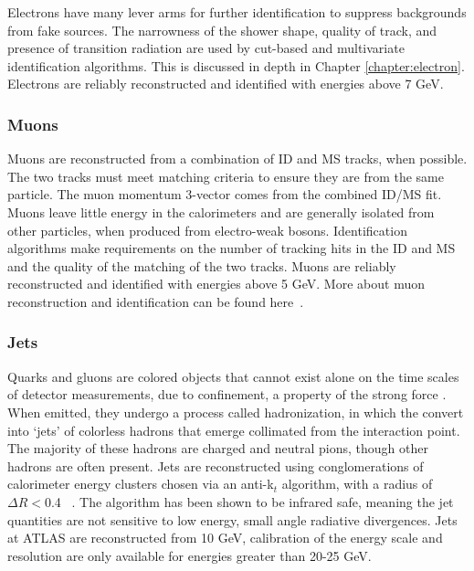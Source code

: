 Electrons have many lever arms for further identification to suppress backgrounds from fake sources. The narrowness of the shower shape, quality of track, and presence of transition radiation are used by cut-based and multivariate identification algorithms. This is discussed in depth in Chapter \ref{chapter:electron}. Electrons are reliably reconstructed and identified with energies above 7 GeV. 

\subsubsection{Muons}

Muons are reconstructed from a combination of ID and MS tracks, when possible. The two tracks must meet matching criteria to ensure they are from the same particle. The muon momentum 3-vector comes from the combined ID/MS fit. Muons leave little energy in the calorimeters and are generally isolated from other particles, when produced from electro-weak bosons. Identification algorithms make requirements on the number of tracking hits in the ID and MS and the quality of the matching of the two tracks. Muons are reliably reconstructed and identified with energies above 5 GeV. More about muon reconstruction and identification can be found here~\cite{MCP2012}.


\subsubsection{Jets}

Quarks and gluons are colored objects that cannot exist alone on the time scales of detector measurements, due to confinement, a property of the strong force . When emitted, they undergo a process called hadronization, in which the convert into `jets' of colorless hadrons that emerge collimated from the interaction point. The majority of these hadrons are charged and neutral pions, though other hadrons are often present. Jets are reconstructed using conglomerations of calorimeter energy clusters chosen via an anti-k$_t$ algorithm, with a radius of $\Delta R <$0.4 ~\cite{Cacciari:2008gp}. The algorithm has been shown to be infrared safe, meaning the jet quantities are not sensitive to low energy, small angle radiative divergences. Jets at ATLAS are reconstructed from 10 GeV, calibration of the energy scale and resolution are only available for energies greater than 20-25 GeV. 

